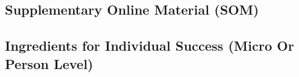\documentclass[11pt, letterpaper]{article}
\begin{document}
\begin{spacing}{2.0}







\section*{\huge Supplementary Online Material (SOM)}

\subsection*{Ingredients for Individual Success (Micro Or Person Level)} %


\end{spacing}
\end{document}
